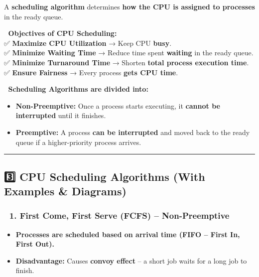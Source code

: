 \documentclass[
]{article}
\providecommand{\tightlist}{%
  \setlength{\itemsep}{0pt}\setlength{\parskip}{0pt}}
\begin{document}
A \textbf{scheduling algorithm} determines \textbf{how the CPU is
assigned to processes} in the ready queue.

📌 \textbf{Objectives of CPU Scheduling:}\\
✅ \textbf{Maximize CPU Utilization} → Keep CPU \textbf{busy}.\\
✅ \textbf{Minimize Waiting Time} → Reduce time spent \textbf{waiting}
in the ready queue.\\
✅ \textbf{Minimize Turnaround Time} → Shorten \textbf{total process
execution time}.\\
✅ \textbf{Ensure Fairness} → Every process \textbf{gets CPU time}.

📌 \textbf{Scheduling Algorithms are divided into:}

\begin{itemize}
\tightlist
\item
  \textbf{Non-Preemptive:} Once a process starts executing, it
  \textbf{cannot be interrupted} until it finishes.
\item
  \textbf{Preemptive:} A process \textbf{can be interrupted} and moved
  back to the ready queue if a higher-priority process arrives.
\end{itemize}

\begin{center}\rule{0.5\linewidth}{0.5pt}\end{center}

\subsection{\texorpdfstring{\textbf{3️⃣ CPU Scheduling Algorithms (With
Examples \&
Diagrams)}}{3️⃣ CPU Scheduling Algorithms (With Examples \& Diagrams)}}\label{cpu-scheduling-algorithms-with-examples-diagrams}

\subsubsection{\texorpdfstring{\textbf{🔹 1. First Come, First Serve
(FCFS) --
Non-Preemptive}}{🔹 1. First Come, First Serve (FCFS) -- Non-Preemptive}}\label{first-come-first-serve-fcfs-non-preemptive}

\begin{itemize}
\tightlist
\item
  \textbf{Processes are scheduled based on arrival time (FIFO -- First
  In, First Out).}
\item
  \textbf{Disadvantage:} Causes \textbf{convoy effect} -- a short job
  waits for a long job to finish.
\end{itemize}
\end{document}
